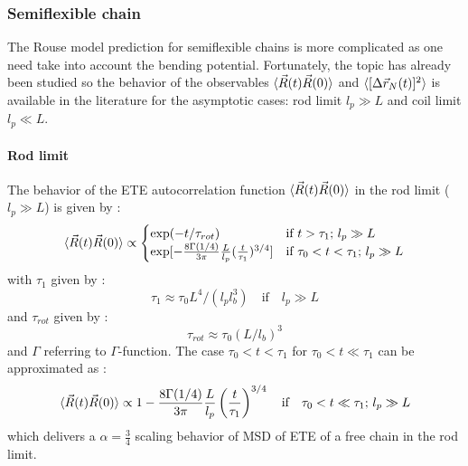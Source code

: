 \documentclass[
    paper=A4,pagesize=automedia,fontsize=12pt,
    BCOR=15mm,DIV=22,
    twoside,headinclude,footinclude=false,
    fleqn,             %
    bibliography=totocnumbered,          %
    listof=totoc,                %
    listof=flat,                 %
    cleardoublepage=empty      %
    numbers=endperiod
]{scrartcl}
\begin{document}
\subsubsection{Semiflexible chain}
\label{sec:rouse_semiflex_chain}
The Rouse model prediction for semiflexible chains is more complicated
as one need take into account the bending potential. 
Fortunately, the topic has already been studied so the behavior of the
observables $\langle\vec{R}(t)\vec{R}(0)\rangle$ and $\langle[\Delta \vec{r}_N(t)]^2\rangle$ 
is available in the literature \cite{Nikoubashman2016} for the asymptotic
cases: rod limit $l_p \gg L$ and coil limit $l_p \ll L$.
\paragraph{Rod limit}
The behavior of the ETE autocorrelation function $\langle\vec{R}(t)\vec{R}(0)\rangle$
in the rod limit ($l_p \gg L$) is given by \cite{Nikoubashman2016}:
\begin{equation} \label{eq:autocorr_ete_rod_limit}
    \langle\vec{R}(t)\vec{R}(0)\rangle \propto \begin{cases}
    \exp(-t/\tau_{rot}) & \text{if } t > \tau_1 \text{; } l_p \gg L \\
    \exp[-\frac{8 \Gamma(1/4)}{3 \pi}\frac{L}{l_p}(\frac{t}{\tau_1})^{3/4}] & \text{if } \tau_0 < t < \tau_1 \text{; } l_p \gg L
    \end{cases}
\end{equation}
with $\tau_1$ given by \cite{Nikoubashman2016}:
\begin{equation} \label{eq:tau_1_rod_limit}
    \tau_1 \approx \tau_0 L^4 / (l_p l_b^3) \quad \text{if} \quad l_p \gg L
\end{equation}
and $\tau_{rot}$ given by \cite{Nikoubashman2016}: 
\begin{equation} \label{eq:tau_rot_rod_limit}
    \tau_{rot} \approx \tau_0 (L/l_b)^3
\end{equation}
and $\Gamma$ referring to $\Gamma$-function.
The case $\tau_0 < t < \tau_1$ for $\tau_0 < t \ll \tau_1$ can be approximated as \cite{Nikoubashman2016}:
\begin{equation}
    \langle\vec{R}(t)\vec{R}(0)\rangle \propto 1-\frac{8 \Gamma(1/4)}{3 \pi}\frac{L}{l_p}\left(\frac{t}{\tau_1}\right)^{3/4} \quad \text{if} \quad \tau_0 < t \ll \tau_1 \text{; } l_p \gg L 
\end{equation}
which delivers a $\alpha = \frac{3}{4}$ scaling behavior of MSD of ETE of a free 
chain in the rod limit.
\\
\\
\end{document}
